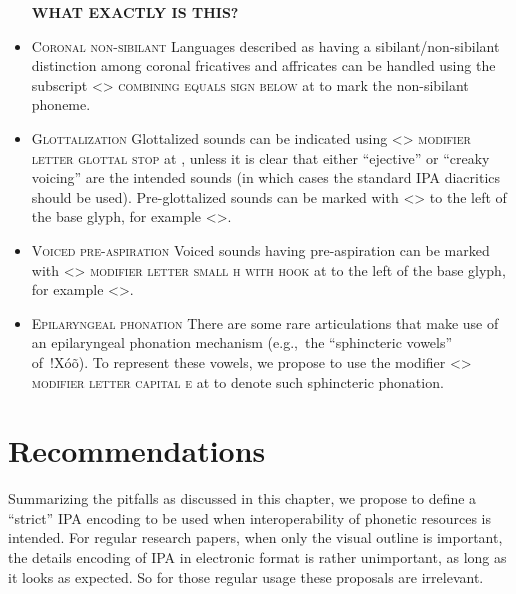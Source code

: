 \begin{itemize}
      \textbf{WHAT EXACTLY IS THIS?}
\item \textsc{Coronal non-sibilant} \newline
      Languages described as having a sibilant/non-sibilant distinction among
      coronal fricatives and affricates can be handled using the subscript
      <> \textsc{combining equals sign below} at  to mark
      the non-sibilant phoneme.
\item \textsc{Glottalization} \newline 
      Glottalized sounds can be indicated using
      <> \textsc{modifier letter glottal stop} at , unless
      it is clear that either ``ejective'' or ``creaky voicing'' are the
      intended sounds (in which cases the standard IPA diacritics should be
      used). Pre-glottalized sounds can be marked with
      <> to the left of the base
      glyph, for example <>.
\item \textsc{Voiced pre-aspiration} \newline Voiced sounds having
      pre-aspiration can be marked with
      <> \textsc{modifier letter
      small h with hook} at  to the left of the base glyph, for
      example <>.
\item \textsc{Epilaryngeal phonation} \newline 
      There are some rare articulations that make
      use of an epilaryngeal phonation mechanism (e.g.,~the “sphincteric vowels”
      of~!Xóõ). To represent these vowels, we propose to use the modifier <>
      \textsc{modifier letter capital e} at  to denote such sphincteric
      phonation.

\end{itemize}

\section{Recommendations}
\label{ipa-recommendations}

Summarizing the pitfalls as discussed in this chapter, we propose to define a 
``strict'' IPA encoding to be used when interoperability of phonetic resources 
is intended. For regular research papers, when only the visual outline is 
important, the details encoding of IPA in electronic format is rather 
unimportant, as long as it looks as expected. So for those regular usage these 
proposals are irrelevant.


